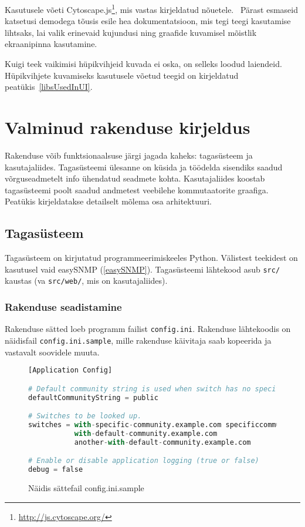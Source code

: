 \documentclass[12pt]{article}
\begin{document}
Kasutusele võeti Cytoscape.js\footnote{\url{http://js.cytoscape.org/}},
mis vastas kirjeldatud nõuetele.~\cite{cytoscapeIntro}
Pärast esmaseid katsetusi demodega tõusis esile hea dokumentatsioon, mis tegi teegi
kasutamise lihtsaks, lai valik erinevaid kujundusi ning graafide kuvamisel mõistlik
ekraanipinna kasutamine.

Kuigi teek vaikimisi hüpikvihjeid kuvada ei oska, on selleks loodud laiendeid.
Hüpikvihjete kuvamiseks kasutusele võetud teegid on kirjeldatud peatükis~\ref{libsUsedInUI}.

\newpage
\section{Valminud rakenduse kirjeldus} \label{description}
Rakenduse võib funktsionaalsuse järgi jagada kaheks: tagasüsteem ja kasutajaliides.
Tagasüsteemi ülesanne on küsida ja töödelda sisendiks saadud võrguseadmetelt info ühendatud
seadmete kohta.
Kasutajaliides koostab tagasüsteemi poolt saadud andmetest veebilehe kommutaatorite graafiga.
Peatükis kirjeldatakse detailselt mõlema osa arhitektuuri.

\subsection{Tagasüsteem}
Tagasüsteem on kirjutatud programmeerimiskeeles Python.
Välistest teekidest on kasutusel vaid easySNMP (\ref{easySNMP}).
Tagasüsteemi lähtekood asub \texttt{src/} kaustas (va \texttt{src/web/}, mis on kasutajaliides).

\subsubsection{Rakenduse seadistamine}
Rakenduse sätted loeb programm failist \texttt{config.ini}.
Rakenduse lähtekoodis on näidisfail \texttt{config.ini.sample}, mille rakenduse käivitaja
saab kopeerida ja vastavalt soovidele muuta.

\begin{figure} [htb]
\begin{lstlisting}[language=Python]
[Application Config]

# Default community string is used when switch has no specific community string set
defaultCommunityString = public

# Switches to be looked up.
switches = with-specific-community.example.com specificcommunity
           with-default-community.example.com
           another-with-default-community.example.com

# Enable or disable application logging (true or false)
debug = false
\end{lstlisting}
\caption{Näidis sättefail config.ini.sample}
\end{figure}
\end{document}
